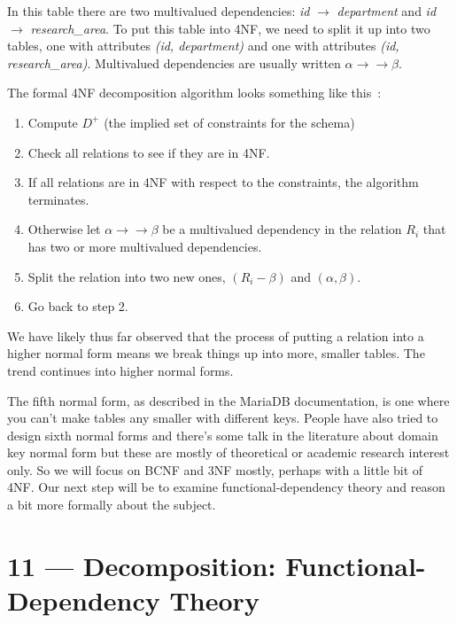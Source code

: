 \documentclass[a4paper]{report}
\begin{document}
In this table there are two multivalued dependencies:  \textit{id} $\rightarrow$ \textit{department} and \textit{id} $\rightarrow$ \textit{research\_area}. To put this table into 4NF, we need to split it up into two tables, one with attributes \textit{(id, department)} and one with attributes \textit{(id, research\_area)}. Multivalued dependencies are usually written $\alpha \rightarrow\rightarrow \beta$.

The formal 4NF decomposition algorithm looks something like this~\cite{dsc}:

\begin{enumerate}
	\item Compute $D^{+}$ (the implied set of constraints for the schema)
	\item Check all relations to see if they are in 4NF.
	\item If all relations are in 4NF with respect to the constraints, the algorithm terminates.
	\item Otherwise let $\alpha \rightarrow\rightarrow \beta$ be a multivalued dependency in the relation $R_{i}$ that has two or more multivalued dependencies. 
	\item Split the relation into two new ones, $(R_{i} - \beta)$ and $(\alpha, \beta)$.
	\item Go back to step 2.
\end{enumerate}


We have likely thus far observed that the process of putting a relation into a higher normal form means we break things up into more, smaller tables. The trend continues into higher normal forms.

The fifth normal form, as described in the MariaDB documentation, is one where you can't make tables any smaller with different keys. People have also tried to design sixth normal forms and there's some talk in the literature about domain key normal form but these are mostly of theoretical or academic research interest only. So we will focus on BCNF and 3NF mostly, perhaps with a little bit of 4NF. Our next step will be to examine functional-dependency theory and reason a bit more formally about the subject.









\chapter*{11 --- Decomposition: Functional-Dependency Theory}
\end{document}
